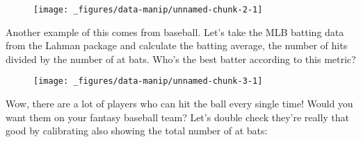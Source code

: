 \begin{figure}[H]
  \centering
  \texttt{[image: \_figures/data-manip/unnamed-chunk-2-1]}
\end{figure}

Another example of this comes from baseball. Let's take the MLB batting
data from the Lahman package and calculate the batting average, the
number of hits divided by the number of at bats. Who's the best batter
according to this metric?

\begin{Shaded}
\begin{Highlighting}[]
 \NormalTok{)}
\StringTok{ }\StringTok{ }\NormalTok{)}
\StringTok{ }
\StringTok{ }  \NormalTok{) /}\StringTok{ } \NormalTok{))}
\StringTok{ }
\StringTok{  }\NormalTok{()}
\end{Highlighting}
\end{Shaded}

\begin{figure}[H]
  \centering
  \texttt{[image: \_figures/data-manip/unnamed-chunk-3-1]}
\end{figure}

Wow, there are a lot of players who can hit the ball every single time!
Would you want them on your fantasy baseball team? Let's double check
they're really that good by calibrating also showing the total number of
at bats:

\begin{Shaded}
\begin{Highlighting}[]
\StringTok{ }
    \NormalTok{) /}\StringTok{ } \NormalTok{),}
   
\NormalTok{)}
\StringTok{ }
\StringTok{  }\NormalTok{(} \NormalTok{) +}\StringTok{ }
\StringTok{  }\NormalTok{()}
\end{Highlighting}
\end{Shaded}

